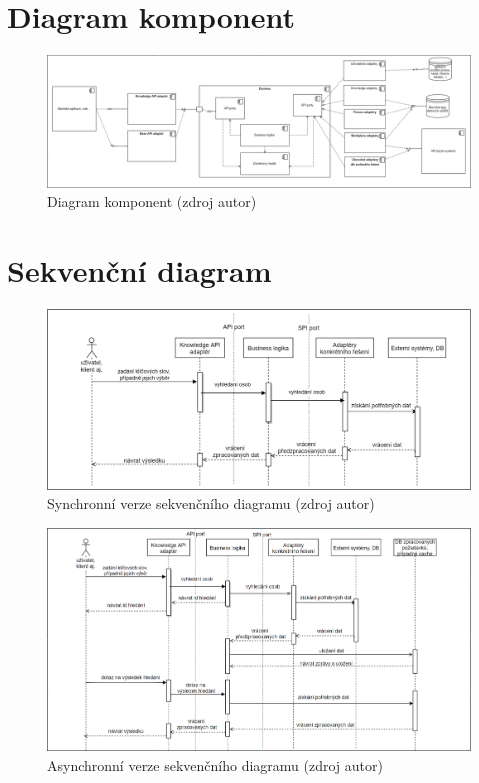 \chapter{Diagram komponent}
\begin{figure}
	\includegraphics[width=\linewidth]{img/component.png}
	\caption{Diagram komponent (zdroj autor)}
	\label{fig:component-model}
\end{figure}

\chapter{Sekvenční diagram}  \label{appendix:sequence}
\begin{figure}
	\includegraphics[width=\linewidth]{img/sequence-synchronous.png}
	\caption{Synchronní verze sekvenčního diagramu (zdroj autor)}
	\label{fig:sequence-synchronous}
\end{figure}

\begin{figure}
	\includegraphics[width=\linewidth]{img/sequence-asynchronous.png}
	\caption{Asynchronní verze sekvenčního diagramu (zdroj autor)}
	\label{fig:sequence-asynchronous}
\end{figure}

